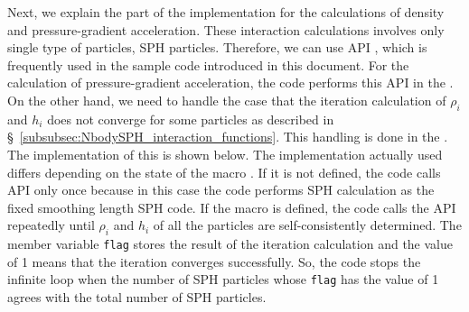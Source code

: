 Next, we explain the part of the implementation for the calculations of density and pressure-gradient acceleration. These interaction calculations involves only single type of particles, SPH particles. Therefore, we can use API , which is frequently used in the sample code introduced in this document. For the calculation of pressure-gradient acceleration, the code performs this API in the \procedure \mainFuncName. On the other hand, we need to handle the case that the iteration calculation of $\rho_{i}$ and $h_{i}$ does not converge for some particles as described in \S~\ref{subsubsec:NbodySPH_interaction_functions}. This handling is done in the \procedure {}. The implementation of this \procedure is shown below. The implementation actually used differs depending on the state of the macro . If it is not defined, the code calls API  only once because in this case the code performs SPH calculation as the fixed smoothing length SPH code. If the macro is defined, the code calls the API repeatedly until $\rho_{i}$ and $h_{i}$ of all the particles are self-consistently determined. The member variable \texttt{flag} stores the result of the iteration calculation and the value of 1 means that the iteration converges successfully. So, the code stops the infinite  loop when the number of SPH particles whose \texttt{flag} has the value of 1 agrees with the total number of SPH particles.


